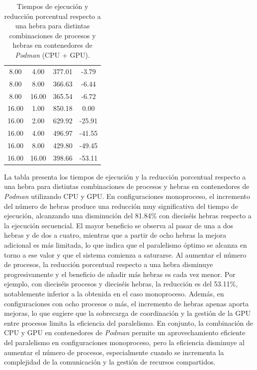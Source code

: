 \begin{table}[ht]
\begin{tabular}{|c|c|c|c|}
        8.00              & 4.00            & 377.01              & -3.79                          \\
        8.00              & 8.00            & 366.63              & -6.44                          \\
        8.00              & 16.00           & 365.54              & -6.72                          \\
        16.00             & 1.00            & 850.18              & 0.00                           \\
        16.00             & 2.00            & 629.92              & -25.91                         \\
        16.00             & 4.00            & 496.97              & -41.55                         \\
        16.00             & 8.00            & 429.80              & -49.45                         \\
        16.00             & 16.00           & 398.66              & -53.11                         \\
        \hline
    \end{tabular}
    \caption{Tiempos de ejecución y reducción porcentual respecto a una hebra para distintas combinaciones de procesos y hebras en contenedores de \textit{Podman} (CPU + GPU).}
    \label{tab:thread_sweep_ubuntu_podman_gpu_time}
\end{table}

La tabla presenta los tiempos de ejecución y la reducción porcentual respecto a una hebra para distintas combinaciones de procesos y hebras en contenedores de \textit{Podman} utilizando CPU y GPU. En configuraciones monoproceso, el incremento del número de hebras produce una reducción muy significativa del tiempo de ejecución, alcanzando una disminución del 81.84\% con dieciséis hebras respecto a la ejecución secuencial. El mayor beneficio se observa al pasar de una a dos hebras y de dos a cuatro, mientras que a partir de ocho hebras la mejora adicional es más limitada, lo que indica que el paralelismo óptimo se alcanza en torno a ese valor y que el sistema comienza a saturarse. Al aumentar el número de procesos, la reducción porcentual respecto a una hebra disminuye progresivamente y el beneficio de añadir más hebras es cada vez menor. Por ejemplo, con dieciséis procesos y dieciséis hebras, la reducción es del 53.11\%, notablemente inferior a la obtenida en el caso monoproceso. Además, en configuraciones con ocho procesos o más, el incremento de hebras apenas aporta mejoras, lo que sugiere que la sobrecarga de coordinación y la gestión de la GPU entre procesos limita la eficiencia del paralelismo. En conjunto, la combinación de CPU y GPU en contenedores de \textit{Podman} permite un aprovechamiento eficiente del paralelismo en configuraciones monoproceso, pero la eficiencia disminuye al aumentar el número de procesos, especialmente cuando se incrementa la complejidad de la comunicación y la gestión de recursos compartidos.

